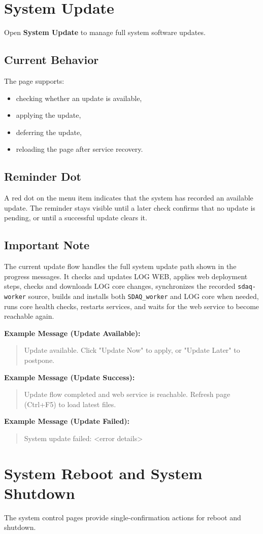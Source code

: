 \documentclass[11pt,a4paper]{article}
\newcommand{\messageexample}[2]{%
\noindent\textbf{Example Message (#1):}\\%
\begin{quote}\raggedright #2\end{quote}%
}
\begin{document}
\section{System Update}
Open \textbf{System Update} to manage full system software updates.

\subsection{Current Behavior}
The page supports:

\begin{itemize}
\item checking whether an update is available,
\item applying the update,
\item deferring the update,
\item reloading the page after service recovery.
\end{itemize}

\subsection{Reminder Dot}
A red dot on the menu item indicates that the system has recorded an available update. The reminder stays visible until a later check confirms that no update is pending, or until a successful update clears it.

\subsection{Important Note}
The current update flow handles the full system update path shown in the progress messages. It checks and updates LOG WEB, applies web deployment steps, checks and downloads LOG core changes, synchronizes the recorded \texttt{sdaq-worker} source, builds and installs both \texttt{SDAQ\_worker} and LOG core when needed, runs core health checks, restarts services, and waits for the web service to become reachable again.

\messageexample{Update Available}{Update available. Click "Update Now" to apply, or "Update Later" to postpone.}
\messageexample{Update Success}{Update flow completed and web service is reachable. Refresh page (Ctrl+F5) to load latest files.}
\messageexample{Update Failed}{System update failed: <error details>}

\section{System Reboot and System Shutdown}
The system control pages provide single-confirmation actions for reboot and shutdown.
\end{document}
